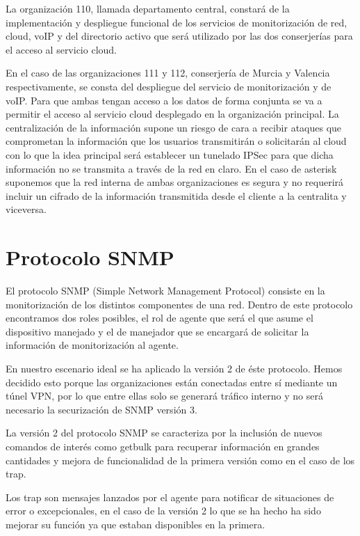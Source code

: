 \documentclass[a4paper]{article}
\begin{document}
\medskip
\noindent La organización 110, llamada departamento central, constará de la implementación y despliegue funcional de los servicios de monitorización de red, cloud, voIP y del directorio activo que será utilizado por las dos conserjerías para el acceso al servicio cloud.

\medskip
\noindent En el caso de las organizaciones 111 y 112, conserjería de Murcia y Valencia respectivamente, se consta del despliegue del servicio de monitorización y de voIP. Para que ambas tengan acceso a los datos de forma conjunta se va a permitir el acceso al servicio cloud desplegado en la organización principal. La centralización de la información supone un riesgo de cara a recibir ataques que comprometan la información que los usuarios transmitirán o solicitarán al cloud con lo que la idea principal será establecer un tunelado IPSec para que dicha información no
se transmita a través de la red en claro. En el caso de asterisk suponemos que la red interna de ambas organizaciones es segura y no requerirá incluir un cifrado de la información transmitida desde el cliente a la centralita y viceversa.


\newpage

\section{Protocolo SNMP}
El protocolo SNMP (Simple Network Management Protocol) consiste en la monitorización de los distintos componentes de una red. Dentro de este protocolo encontramos dos roles posibles, el rol de agente que será el que asume el dispositivo manejado y el de manejador que se encargará de solicitar la información de monitorización al agente.

\medskip
\noindent En nuestro escenario ideal se ha aplicado la versión 2 de éste protocolo. Hemos decidido esto porque las organizaciones están conectadas entre sí mediante un túnel VPN, por lo que entre ellas solo se generará tráfico interno y no será necesario la securización de SNMP versión 3. 

\medskip
\noindent La versión 2 del protocolo SNMP se caracteriza por la inclusión de nuevos comandos de interés como getbulk para recuperar información en grandes cantidades y mejora de funcionalidad de la primera versión como en el caso de los trap.

\medskip
\noindent Los trap son mensajes lanzados por el agente para notificar de situaciones de error o excepcionales, en el caso de la versión 2 lo que se ha hecho ha sido mejorar su función
ya que estaban disponibles en la primera.
\end{document}
